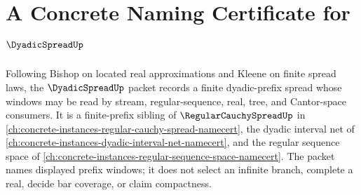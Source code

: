 \chapter{A Concrete Naming Certificate for $\DyadicSpreadUp$}
\label{ch:concrete-instances-dyadic-spread-namecert}

Following Bishop on located real approximations and Kleene on finite spread laws, the $\DyadicSpreadUp$ packet records a finite dyadic-prefix spread whose windows may be read by stream, regular-sequence, real, tree, and Cantor-space consumers. It is a finite-prefix sibling of $\RegularCauchySpreadUp$ in \autoref{ch:concrete-instances-regular-cauchy-spread-namecert}, the dyadic interval net of \autoref{ch:concrete-instances-dyadic-interval-net-namecert}, and the regular sequence space of \autoref{ch:concrete-instances-regular-sequence-space-namecert}. The packet names displayed prefix windows; it does not select an infinite branch, complete a real, decide bar coverage, or claim compactness.

